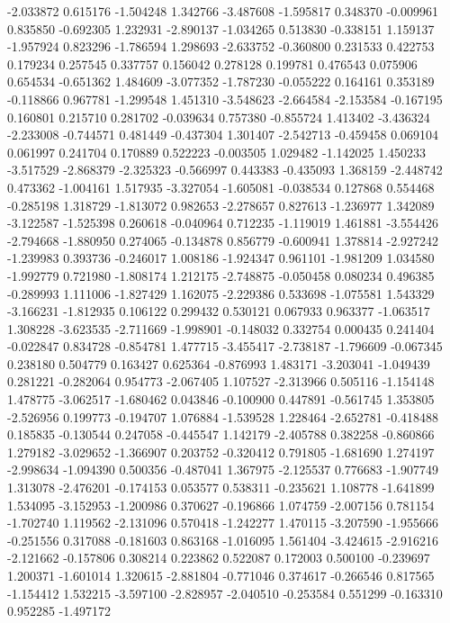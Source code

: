 -2.033872
0.615176
-1.504248
1.342766
-3.487608
-1.595817
0.348370
-0.009961
0.835850
-0.692305
1.232931
-2.890137
-1.034265
0.513830
-0.338151
1.159137
-1.957924
0.823296
-1.786594
1.298693
-2.633752
-0.360800
0.231533
0.422753
0.179234
0.257545
0.337757
0.156042
0.278128
0.199781
0.476543
0.075906
0.654534
-0.651362
1.484609
-3.077352
-1.787230
-0.055222
0.164161
0.353189
-0.118866
0.967781
-1.299548
1.451310
-3.548623
-2.664584
-2.153584
-0.167195
0.160801
0.215710
0.281702
-0.039634
0.757380
-0.855724
1.413402
-3.436324
-2.233008
-0.744571
0.481449
-0.437304
1.301407
-2.542713
-0.459458
0.069104
0.061997
0.241704
0.170889
0.522223
-0.003505
1.029482
-1.142025
1.450233
-3.517529
-2.868379
-2.325323
-0.566997
0.443383
-0.435093
1.368159
-2.448742
0.473362
-1.004161
1.517935
-3.327054
-1.605081
-0.038534
0.127868
0.554468
-0.285198
1.318729
-1.813072
0.982653
-2.278657
0.827613
-1.236977
1.342089
-3.122587
-1.525398
0.260618
-0.040964
0.712235
-1.119019
1.461881
-3.554426
-2.794668
-1.880950
0.274065
-0.134878
0.856779
-0.600941
1.378814
-2.927242
-1.239983
0.393736
-0.246017
1.008186
-1.924347
0.961101
-1.981209
1.034580
-1.992779
0.721980
-1.808174
1.212175
-2.748875
-0.050458
0.080234
0.496385
-0.289993
1.111006
-1.827429
1.162075
-2.229386
0.533698
-1.075581
1.543329
-3.166231
-1.812935
0.106122
0.299432
0.530121
0.067933
0.963377
-1.063517
1.308228
-3.623535
-2.711669
-1.998901
-0.148032
0.332754
0.000435
0.241404
-0.022847
0.834728
-0.854781
1.477715
-3.455417
-2.738187
-1.796609
-0.067345
0.238180
0.504779
0.163427
0.625364
-0.876993
1.483171
-3.203041
-1.049439
0.281221
-0.282064
0.954773
-2.067405
1.107527
-2.313966
0.505116
-1.154148
1.478775
-3.062517
-1.680462
0.043846
-0.100900
0.447891
-0.561745
1.353805
-2.526956
0.199773
-0.194707
1.076884
-1.539528
1.228464
-2.652781
-0.418488
0.185835
-0.130544
0.247058
-0.445547
1.142179
-2.405788
0.382258
-0.860866
1.279182
-3.029652
-1.366907
0.203752
-0.320412
0.791805
-1.681690
1.274197
-2.998634
-1.094390
0.500356
-0.487041
1.367975
-2.125537
0.776683
-1.907749
1.313078
-2.476201
-0.174153
0.053577
0.538311
-0.235621
1.108778
-1.641899
1.534095
-3.152953
-1.200986
0.370627
-0.196866
1.074759
-2.007156
0.781154
-1.702740
1.119562
-2.131096
0.570418
-1.242277
1.470115
-3.207590
-1.955666
-0.251556
0.317088
-0.181603
0.863168
-1.016095
1.561404
-3.424615
-2.916216
-2.121662
-0.157806
0.308214
0.223862
0.522087
0.172003
0.500100
-0.239697
1.200371
-1.601014
1.320615
-2.881804
-0.771046
0.374617
-0.266546
0.817565
-1.154412
1.532215
-3.597100
-2.828957
-2.040510
-0.253584
0.551299
-0.163310
0.952285
-1.497172
